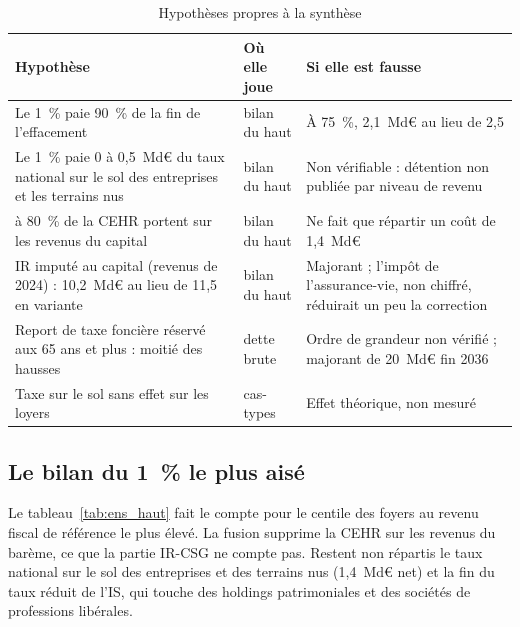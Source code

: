 \documentclass[11pt,a4paper]{article}
\begin{document}
\begin{table}[!htbp]\centering\scriptsize
\caption{Hypothèses propres à la synthèse}\label{tab:meth_hyp}
\begin{tabularx}{\linewidth}{@{}>{\raggedright\arraybackslash}p{5.2cm}>{\raggedright\arraybackslash}p{2.2cm}>{\raggedright\arraybackslash}X@{}}
\toprule
Hypothèse & Où elle joue & Si elle est fausse \\
\midrule
Le 1~\% paie 90~\% de la fin de l'effacement & bilan du haut & À 75~\%, 2,1~Md€ au lieu de 2,5 \\
Le 1~\% paie 0 à 0,5~Md€ du taux national sur le sol des entreprises et les terrains nus & bilan du haut & Non vérifiable :
détention non publiée par niveau de revenu \\
50 à 80~\% de la CEHR portent sur les revenus du capital & bilan du haut & Ne fait que répartir un coût de 1,4~Md€ \\
IR imputé au capital (revenus de 2024) : 10,2~Md€ au lieu de 11,5 en variante & bilan du haut & Majorant ; l'impôt de
l'assurance-vie, non chiffré, réduirait un peu la correction \\
Report de taxe foncière réservé aux 65 ans et plus : moitié des hausses & dette brute & Ordre de grandeur non vérifié ;
majorant de 20~Md€ fin 2036 \\
Taxe sur le sol sans effet sur les loyers & cas-types & Effet théorique, non mesuré \\
\bottomrule
\end{tabularx}
\end{table}

\subsection{Le bilan du 1~\% le plus aisé}\label{ann:meth_haut}

Le tableau~\ref{tab:ens_haut} fait le compte pour le centile des foyers au revenu fiscal de référence le plus élevé.
La fusion supprime la CEHR sur les revenus du barème, ce que la partie IR-CSG ne compte pas. Restent non répartis le
taux national sur le sol des entreprises et des terrains nus (1,4~Md€ net) et la fin du taux réduit de l'IS, qui touche
des holdings patrimoniales et des sociétés de professions libérales.
\end{document}
